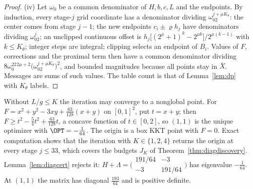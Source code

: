 \begin{proof}
(iv) Let $\omega_0$ be a common denominator of $H,b,c,L$ and the endpoints.
By induction, every stage-$j$ grid coordinate has a denominator dividing
$\omega_02^{j+\mu K_\theta}$: the center comes from stage $j-1$; the new
endpoints $c_i\pm\varrho h_j$ have denominators dividing $\omega_02^j$; an
unclipped continuous offset is
$h_j\bigl[(2^\mu+1)^k-2^{\mu k}\bigr]/2^{\mu(k-1)}$ with $k\le K_\theta$;
integer steps are integral; clipping selects an endpoint of $B_i$. Values of
$F$, corrections and the proximal term then have a common denominator
dividing $8\omega_0^22^{2\mu+2}\bigl(\omega_02^{j+\mu K_\theta}\bigr)^2$, and
bounded magnitudes because all points stay in $\bar X$. Messages are sums of
such values. The table count is that of Lemma~\ref{lem:dp} with $K_\theta$ labels.
\end{proof}

\begin{remark}\label{rem:falseguess}
Without $L/g\le K$ the iteration may converge to a nonglobal point. For
$F=x^2+y^2-3xy+\frac{63}{128}(x+y)$ on $[0,1]^2$, put $t=x+y$; then
$F\ge t^2-\frac54t^2+\frac{63}{128}t$, a concave function of $t\in[0,2]$, so
$(1,1)$ is the unique optimizer with $\OPT=-\frac1{64}$. The origin is a box
KKT point with $F=0$. Exact computation shows that the iteration with
$K\in\{1,2,4\}$ returns the origin at every stage $j\le33$, which covers the
budgets $J_K$ of Theorem~\ref{thm:diagdiscovery}. Lemma~\ref{lem:diagcert}
rejects it: $H+\Lambda=\bigl(\begin{smallmatrix}191/64&-3\\-3&191/64\end{smallmatrix}\bigr)$
has eigenvalue $-\frac1{64}$. At $(1,1)$ the matrix has diagonal $\frac{193}{64}$
and is positive definite.
\end{remark}

